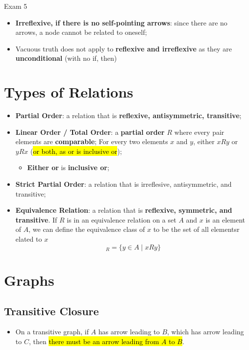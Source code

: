 \documentclass{note}
\begin{document}
\begin{note}{Exam 5}
\begin{itemize}
	    \item \textbf{Irreflexive, if there is no self-pointing arrows}: since there are no arrows, a node cannot be related to oneself;

	    \item Vacuous truth does not apply to \textbf{reflexive and irreflexive} as they are \textbf{unconditional} (with no if, then)

	\end{itemize}


        \section{Types of Relations}

        \begin{itemize}
            \item \textbf{Partial Order}: a relation that is \textbf{reflexive, antisymmetric, transitive};
            \item \textbf{Linear Order / Total Order}: a \textbf{partial order} $ R $ where every pair elements are
            \textbf{comparable}; For every two elements $ x $ and $ y $, either $ x R y $ or $ y R x$
            (\hl{or both, as or is inclusive or});
            \begin{itemize}
                \item \textbf{Either or} is \textbf{inclusive or};
            \end{itemize}
            \item \textbf{Strict Partial Order}: a relation that is irreflesive, antisymmetric, and transitive;
            \item \textbf{Equivalence Relation}: a relation that is \textbf{reflexive, symmetric, and transitive}. If $ R $ is
            in an equivalence relation on a set $ A $ and $ x $ is an element of $ A $, we can define the equivalence class of $ x $
            to be the set of all elementsr elated to $ x $
            \begin{displaymath}
               [x]_{R}=  \{ y \in A \mid x R y \}
            \end{displaymath}
        \end{itemize}


        \section{Graphs}

        \subsection{Transitive Closure}
        \begin{itemize}
            \item On a transitive graph, if $ A $ has arrow leading to $ B $, which has arrow leading to $ C $, then
            \hl{there must be an arrow leading from $ A $ to $ B $}.


\end{itemize}
\end{note}
\end{document}
